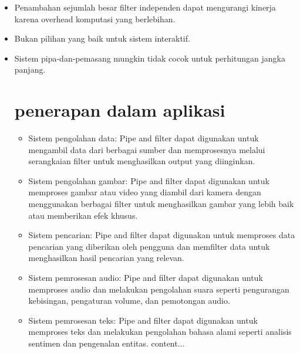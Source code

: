 \documentclass{article}
\begin{document}
	\begin{itemize}
		\item 	Penambahan sejumlah besar filter independen dapat mengurangi kinerja karena overhead komputasi yang berlebihan.
		\item Bukan pilihan yang baik untuk sistem interaktif.
		\item Sistem pipa-dan-pemasang mungkin tidak cocok untuk perhitungan jangka panjang.
		
	\section{penerapan dalam aplikasi}
	\begin{itemize}
		\item Sistem pengolahan data: Pipe and filter dapat digunakan untuk mengambil data dari berbagai sumber dan memprosesnya melalui serangkaian filter untuk menghasilkan output yang diinginkan.
			
		\item Sistem pengolahan gambar: Pipe and filter dapat digunakan untuk memproses gambar atau video yang diambil dari kamera dengan menggunakan berbagai filter untuk menghasilkan gambar yang lebih baik atau memberikan efek khusus.
			
		\item Sistem pencarian: Pipe and filter dapat digunakan untuk memproses data pencarian yang diberikan oleh pengguna dan memfilter data untuk menghasilkan hasil pencarian yang relevan.
			
		\item Sistem pemrosesan audio: Pipe and filter dapat digunakan untuk memproses audio dan melakukan pengolahan suara seperti pengurangan kebisingan, pengaturan volume, dan pemotongan audio.
			
		\item Sistem pemrosesan teks: Pipe and filter dapat digunakan untuk memproses teks dan melakukan pengolahan bahasa alami seperti analisis sentimen dan pengenalan entitas.
			content...
		\end{itemize}
	\end{itemize}
\end{document}
